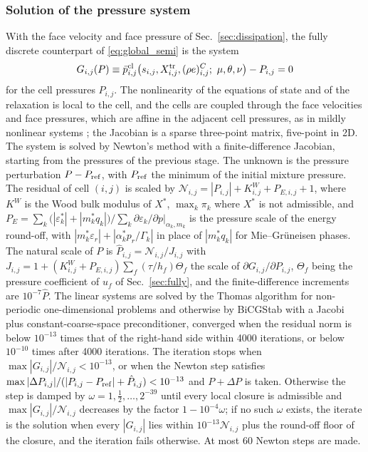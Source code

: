 \documentclass[a4paper,fleqn]{cas-sc}
\begin{document}
\subsubsection{Solution of the pressure system}
\label{sec:pressure_system}
With the face velocity and face pressure of Sec.~\ref{sec:dissipation}, the fully discrete counterpart of
\eqref{eq:global_semi} is the system
\begin{equation}
G_{i,j}(P)\equiv\bar p^{\rm cl}_{i,j}\big(s_{i,j},X^{\rm tr}_{i,j},(\rho e)^C_{i,j};\ \mu,\theta,\nu\big)-P_{i,j}=0
\label{eq:global}
\end{equation}
for the cell pressures $P_{i,j}$. The nonlinearity of the equations of state and of the relaxation is local to the cell, and the cells are
coupled through the face velocities and face pressures, which are affine in the adjacent cell pressures, as in mildly
nonlinear systems \cite{DumbserCasulli2016,CasulliZanolli2012}; the Jacobian is a sparse three-point matrix, five-point in 2D.
The system is solved by Newton's method with a finite-difference Jacobian, starting from the pressures of the previous
stage. The unknown is the pressure perturbation $P-P_{\rm ref}$, with $P_{\rm ref}$ the
minimum of the initial mixture pressure. The residual of cell $(i,j)$ is scaled by $\mathcal N_{i,j}=|P_{i,j}|+K^W_{i,j}+P_{E,i,j}+1$, where
$K^W$ is the Wood bulk modulus of $X^*$, $\max_k\pi_k$ where $X^*$ is not admissible, and $P_{E}=\sum_k\big(|\varepsilon^*_k|+|m^*_kq_k|\big)/\sum_k\partial\varepsilon_k/\partial p|_{\alpha_k,m_k}$ is the
pressure scale of the energy round-off, with $|m^*_k\varepsilon_r|+|\alpha^*_kp_r/\Gamma_k|$ in place of $|m^*_kq_k|$ for Mie--Gr\"uneisen phases. The natural scale of $P$ is $\hat P_{i,j}=\mathcal N_{i,j}/J_{i,j}$ with
$J_{i,j}=1+(K^W_{i,j}+P_{E,i,j})\sum_f(\tau/h_f)\Theta_f$ the scale of $\partial G_{i,j}/\partial P_{i,j}$, $\Theta_f$ being the pressure coefficient of $u_f$ of Sec.~\ref{sec:fully},
and the finite-difference increments are $10^{-7}\hat P$. The linear systems are solved by the Thomas algorithm for
non-periodic one-dimensional problems and otherwise by BiCGStab with a Jacobi plus constant-coarse-space
preconditioner, converged when the residual norm is below $10^{-13}$ times that of the right-hand side within 4000 iterations, or below $10^{-10}$ times after 4000 iterations. The
iteration stops when $\max|G_{i,j}|/\mathcal N_{i,j}<10^{-13}$, or when the Newton step satisfies $\max|\Delta P_{i,j}|/(|P_{i,j}-P_{\rm ref}|+\hat P_{i,j})<10^{-13}$
and $P+\Delta P$ is taken. Otherwise the step is damped by $\omega=1,\tfrac12,\dots,2^{-39}$ until every local closure is
admissible and $\max|G_{i,j}|/\mathcal N_{i,j}$ decreases by the factor $1-10^{-4}\omega$; if no such $\omega$ exists, the iterate is the solution when every $|G_{i,j}|$ lies within $10^{-13}\mathcal N_{i,j}$ plus the
round-off floor of the closure, and the iteration fails otherwise. At most 60 Newton steps are made.
\end{document}
